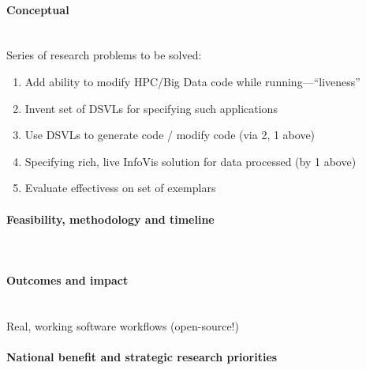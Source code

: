 \documentclass[a4paper,fontsize=12pt]{scrartcl}
\begin{document}

\paragraph*{Conceptual}\mbox{}\\

Series of research problems to be solved:

\begin{enumerate}
\item Add ability to modify HPC/Big Data code while
  running---``liveness''
\item Invent set of DSVLs for specifying such applications
\item Use DSVLs to generate code / modify code (via 2, 1 above)
\item Specifying rich, live InfoVis solution for data processed (by 1
  above)
\item Evaluate effectivess on set of exemplars
\end{enumerate}

\paragraph*{Feasibility, methodology and timeline}\mbox{}\\



\paragraph*{Outcomes and impact}\mbox{}\\

Real, working software workflows (open-source!)

\paragraph*{National benefit and strategic research priorities}\mbox{}\\
\end{document}

